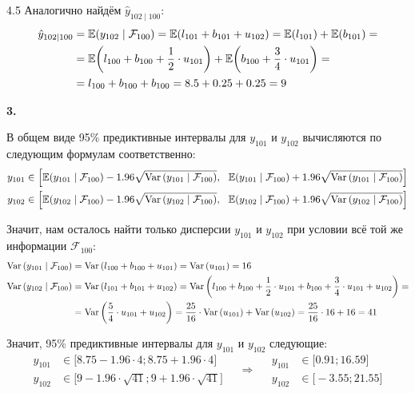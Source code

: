\begin{solution}{{4.5}}
Аналогично найдём $\hat{y}_{102 \mid 100}$:
\begin{align*}
    \hat{y}_{102 \mid 100} &= \mathbb{E}{\left(y_{102} \mid \mathcal{F}_{100}\right)} = \mathbb{E}{\left(l_{101} + b_{101} + u_{102}\right)} = \mathbb{E}{\left(l_{101}\right)} + \mathbb{E}{\left(b_{101}\right)} = \\ &= \mathbb{E}{\left(l_{100} + b_{100} + \frac{1}{2} \cdot u_{101}\right)} + \mathbb{E}{\left(b_{100} + \frac{3}{4} \cdot u_{101}\right)} = \\
    &= l_{100} + b_{100} + b_{100} = 8.5 + 0.25 + 0.25 = 9
\end{align*}

\textbf{3.} 

В общем виде 95\% предиктивные интервалы для $y_{101}$ и $y_{102}$ вычисляются по следующим формулам соответственно:
\begin{gather*}
    y_{101} \in \left[\mathbb{E}{\left(y_{101} \mid \mathcal{F}_{100}\right)} - 1.96 \sqrt{\operatorname{Var}{\left(y_{101} \mid \mathcal{F}_{100}\right)}},\ \  \mathbb{E}{\left(y_{101} \mid \mathcal{F}_{100}\right)} + 1.96 \sqrt{\operatorname{Var}{\left(y_{101} \mid \mathcal{F}_{100}\right)}}\right] \\
    y_{102} \in \left[\mathbb{E}{\left(y_{102} \mid \mathcal{F}_{100}\right)} - 1.96 \sqrt{\operatorname{Var}{\left(y_{102} \mid \mathcal{F}_{100}\right)}},\ \  \mathbb{E}{\left(y_{102} \mid \mathcal{F}_{100}\right)} + 1.96 \sqrt{\operatorname{Var}{\left(y_{102} \mid \mathcal{F}_{100}\right)}}\right]
\end{gather*}

Значит, нам осталось найти только дисперсии $y_{101}$ и $y_{102}$ при условии всё той же информации $\mathcal{F}_{100}$:
\begin{align*}
    \operatorname{Var}{\left(y_{101} \mid \mathcal{F}_{100}\right)} &= \operatorname{Var}{\left(l_{100} + b_{100} + u_{101}\right)} = \operatorname{Var}{\left(u_{101}\right)} = 16 \\
    \operatorname{Var}{\left(y_{102} \mid \mathcal{F}_{100}\right)} &= \operatorname{Var}{\left(l_{101} + b_{101} + u_{102}\right)} = \operatorname{Var}{\left(l_{100} + b_{100} + \frac{1}{2} \cdot u_{101} + b_{100} + \frac{3}{4} \cdot u_{101} + u_{102}\right)} = \\
    &= \operatorname{Var}{\left(\frac{5}{4} \cdot u_{101} + u_{102}\right)} = \frac{25}{16} \cdot \operatorname{Var}{\left(u_{101}\right)} + \operatorname{Var}{\left(u_{102}\right)} = \frac{25}{16} \cdot 16 + 16 = 41
\end{align*}

Значит, 95\% предиктивные интервалы для $y_{101}$ и $y_{102}$ следующие:
\[
\begin{aligned}
    y_{101} &\in \big[8.75 - 1.96 \cdot 4; 8.75 + 1.96 \cdot 4\big] \\
    y_{102} &\in \big[9 - 1.96 \cdot \sqrt{41}; 9 + 1.96 \cdot \sqrt{41}\big]
\end{aligned}
\quad \Rightarrow \quad
\begin{aligned}
    y_{101} &\in \big[0.91; 16.59\big] \\
    y_{102} &\in \big[-3.55; 21.55\big]
\end{aligned}
\]

\end{solution}
